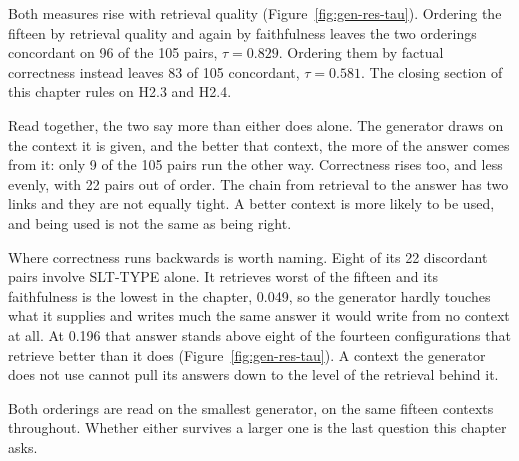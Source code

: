 Both measures rise with retrieval quality (Figure~\ref{fig:gen-res-tau}). Ordering the fifteen by retrieval quality and again by
faithfulness leaves the two orderings concordant on 96 of the 105 pairs, $\tau = 0.829$. Ordering
them by factual correctness instead leaves 83 of 105 concordant, $\tau = 0.581$. The closing
section of this chapter rules on H2.3 and H2.4.

Read together, the two say more than either does alone. The generator draws on the context it is
given, and the better that context, the more of the answer comes from it: only 9 of the 105 pairs
run the other way. Correctness rises too, and less evenly, with 22 pairs out of order. The chain
from retrieval to the answer has two links and they are not equally tight. A better context is
more likely to be used, and being used is not the same as being right.

Where correctness runs backwards is worth naming. Eight of its 22 discordant pairs involve
SLT-TYPE alone. It retrieves worst of the fifteen and its faithfulness is the lowest in the
chapter, 0.049, so the generator hardly touches what it supplies and writes much the same answer
it would write from no context at all. At 0.196 that answer stands above eight of the fourteen
configurations that retrieve better than it does (Figure~\ref{fig:gen-res-tau}). A context the generator does not use cannot pull
its answers down to the level of the retrieval behind it.

Both orderings are read on the smallest generator, on the same fifteen contexts throughout.
Whether either survives a larger one is the last question this chapter asks.

